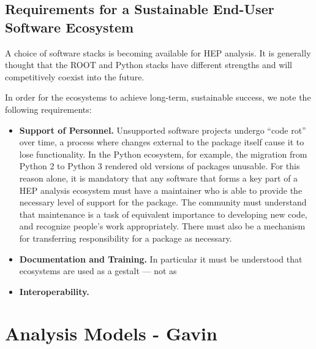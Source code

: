 \subsection{Requirements for a Sustainable End-User Software Ecosystem}
A choice of software stacks is becoming available for HEP analysis. It is generally thought that the ROOT and Python stacks have different strengths and will competitively coexist into the future.

In order for the ecosystems to achieve long-term, sustainable success, we note the following requirements:
\begin{itemize}
    \item \textbf{Support of Personnel.} Unsupported software projects undergo ``code rot'' over time, a process where changes external to the package itself cause it to lose functionality. In the Python ecosystem, for example, the migration from Python 2 to Python 3 rendered old versions of packages unusable. For this reason alone, it is mandatory that any software that forms a key part of a HEP analysis ecosystem must have a maintainer who is able to provide the necessary level of support for the package. The community must understand that maintenance is a task of equivalent importance to developing new code, and recognize people's work appropriately. There must also be a mechanism for transferring responsibility for a package as necessary.
    \item \textbf{Documentation and Training.} In particular it must be understood that ecosystems are used as a gestalt --- not as 
    \item \textbf{Interoperability.} 
\end{itemize}

\section{Analysis Models - Gavin}

